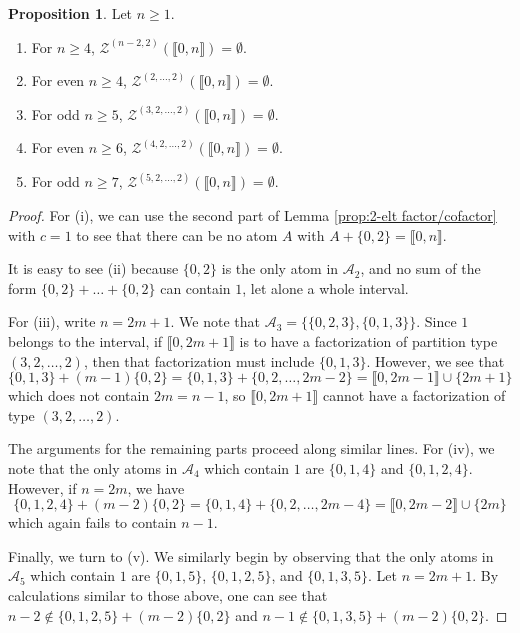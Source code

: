 \documentclass{report}
\newcommand{\Z}{\mathcal{Z}}
\newcommand{\llb}{\llbracket}
\newcommand{\rrb}{\rrbracket}
\renewcommand{\:}{\text{:}}
\theoremstyle{definition}
\newtheorem{prop}[defn]{Proposition}
\begin{document}
\begin{prop} \label{prop:bad types}
	Let $n\ge 1$.
	\begin{enumerate}[label={\rm (\roman{*})}]
		\item For $n\ge 4$, $\Z^{(n-2,2)}(\llb 0,n \rrb) = \emptyset$.
		\item For even $n\ge 4$, $\Z^{(2,\dots,2)}(\llb 0,n \rrb) = \emptyset$.
		\item For odd $n\ge 5$, $\Z^{(3,2,\dots, 2)}(\llb 0,n \rrb) = \emptyset$.
		\item For even $n\ge 6$, $\Z^{(4,2,\dots, 2)}(\llb 0,n \rrb) = \emptyset$.
		\item For odd $n\ge 7$, $\Z^{(5,2,\dots, 2)}(\llb 0,n \rrb) = \emptyset$.
	\end{enumerate}
\end{prop}
\begin{proof}
	For (i), we can use the second part of Lemma \ref{prop:2-elt factor/cofactor} with $c = 1$ to see that there can be no atom $A$ with $A+\{0,2\} = \llb 0,n \rrb$.
	
	It is easy to see (ii) because $\{0,2\}$ is the only atom in $\mathcal{A}_2$, and no sum of the form $\{0,2\} +\dots +\{0,2\}$ can contain $1$, let alone a whole interval.
	
	For (iii), write $n = 2m+1$.
	We note that $\mathcal{A}_3 = \{\{0,2,3\}, \{0,1,3\} \}$.
	Since $1$ belongs to the interval, if $\llb 0,2m+1 \rrb$ is to have a factorization of partition type $(3,2,\dots,2)$, then that factorization must include $\{0,1,3\}$.
	However, we see that 
	\[ \{0,1,3\} + (m-1)\{0,2\}  = \{0,1,3\} + \{0,2,\dots, 2m-2\} = \llb 0, 2m-1 \rrb \cup \{2m+1\} \]
	which does not contain $2m = n-1$, so $\llb 0,2m+1\rrb$ cannot have a factorization of type $(3,2,\dots,2)$.
	
	The arguments for the remaining parts proceed along similar lines.
	For (iv), we note that the only atoms in $\mathcal{A}_4$ which contain $1$ are $\{0,1,4\}$ and $\{0,1,2,4\}$.
	However, if $n = 2m$, we have
	\[ \{0,1,2,4\} + (m-2)\{0,2\} = \{0,1,4\} + \{0,2,\dots, 2m-4\} = \llb 0, 2m-2 \rrb \cup \{2m\} \]
	which again fails to contain $n-1$.
	
	Finally, we turn to (v).
	We similarly begin by observing that the only atoms in $\mathcal{A}_5$ which contain $1$ are $\{0,1,5\}$, $\{0,1,2,5\}$, and $\{0,1,3,5\}$.
	Let $n = 2m+1$.
	By calculations similar to those above, one can see that $n-2 \notin \{0,1,2,5\} +(m-2)\{0,2\}$ and $n-1\notin \{0,1,3,5\} + (m-2)\{0,2\}$.
\end{proof}
\end{document}
